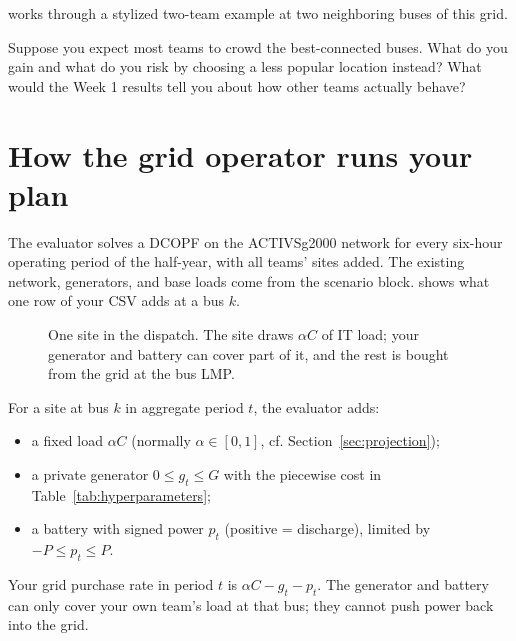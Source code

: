 \documentclass[10pt]{article}
\begin{document}
 works through a stylized two-team example at two
neighboring buses of this grid.

\begin{exercisebox}
Suppose you expect most teams to crowd the best-connected buses. What do you
gain and what do you risk by choosing a less popular location instead? What
would the Week 1 results tell you about how other teams actually behave?
\end{exercisebox}

\section{How the grid operator runs your plan}\label{sec:model}

The evaluator solves a DCOPF on the ACTIVSg2000 network for every six-hour
operating period of the half-year, with all teams' sites added. The existing
network, generators, and base loads come from the scenario block. 
shows what one row of your CSV adds at a bus $k$.

\begin{figure}[htbp]
  \centering
  
  \caption{One site in the dispatch. The site draws $\alpha C$ of IT load; your
  generator and battery can cover part of it, and the rest is bought from the
  grid at the bus LMP.}
  \label{fig:site}
\end{figure}

For a site at bus $k$ in aggregate period $t$, the evaluator adds:
\begin{itemize}[leftmargin=*]
  \item a fixed load $\alpha C$ (normally $\alpha \in [0,1]$, cf. Section~\ref{sec:projection});
  \item a private generator $0 \le g_t \le G$ with the piecewise cost in Table~\ref{tab:hyperparameters};
  \item a battery with signed power $p_t$ (positive = discharge), limited by
    $-P \le p_t \le P$.
\end{itemize}
Your grid purchase rate in period $t$ is $\alpha C - g_t - p_t$. The generator and
battery can only cover your own team's load at that bus; they cannot push power
back into the grid.
\end{document}
